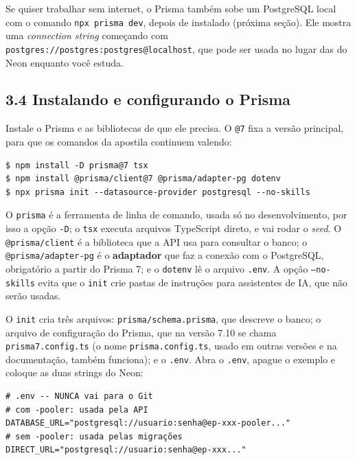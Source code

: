 Se quiser trabalhar sem internet, o Prisma também sobe um PostgreSQL local com o comando \texttt{npx prisma dev}, depois de instalado (próxima seção). Ele mostra uma \textit{connection string} começando com \texttt{postgres://postgres:postgres@localhost}, que pode ser usada no lugar das do Neon enquanto você estuda.

\subsection{3.4 Instalando e configurando o Prisma}

Instale o Prisma e as bibliotecas de que ele precisa. O \texttt{@7} fixa a versão principal, para que os comandos da apostila continuem valendo:

\begin{codigo}
\begin{Verbatim}[breaklines=true, breaksymbolleft={}, fontsize=\footnotesize]
$ npm install -D prisma@7 tsx
$ npm install @prisma/client@7 @prisma/adapter-pg dotenv
$ npx prisma init --datasource-provider postgresql --no-skills
\end{Verbatim}
\end{codigo}

O \texttt{prisma} é a ferramenta de linha de comando, usada só no desenvolvimento, por isso a opção \texttt{-D}; o \texttt{tsx} executa arquivos TypeScript direto, e vai rodar o \textit{seed}. O \texttt{@prisma/client} é a biblioteca que a API usa para consultar o banco; o \texttt{@prisma/adapter-pg} é o \textbf{adaptador} que faz a conexão com o PostgreSQL, obrigatório a partir do Prisma 7; e o \texttt{dotenv} lê o arquivo \texttt{.env}. A opção \texttt{--no-skills} evita que o \texttt{init} crie pastas de instruções para assistentes de IA, que não serão usadas.

O \texttt{init} cria três arquivos: \texttt{prisma/schema.prisma}, que descreve o banco; o arquivo de configuração do Prisma, que na versão 7.10 se chama \texttt{prisma7.config.ts} (o nome \texttt{prisma.config.ts}, usado em outras versões e na documentação, também funciona); e o \texttt{.env}. Abra o \texttt{.env}, apague o exemplo e coloque as duas strings do Neon:

\begin{codigo}
\begin{Verbatim}[breaklines=true, breaksymbolleft={}, fontsize=\footnotesize]
# .env -- NUNCA vai para o Git
# com -pooler: usada pela API
DATABASE_URL="postgresql://usuario:senha@ep-xxx-pooler..."
# sem -pooler: usada pelas migrações
DIRECT_URL="postgresql://usuario:senha@ep-xxx..."
\end{Verbatim}
\end{codigo}

